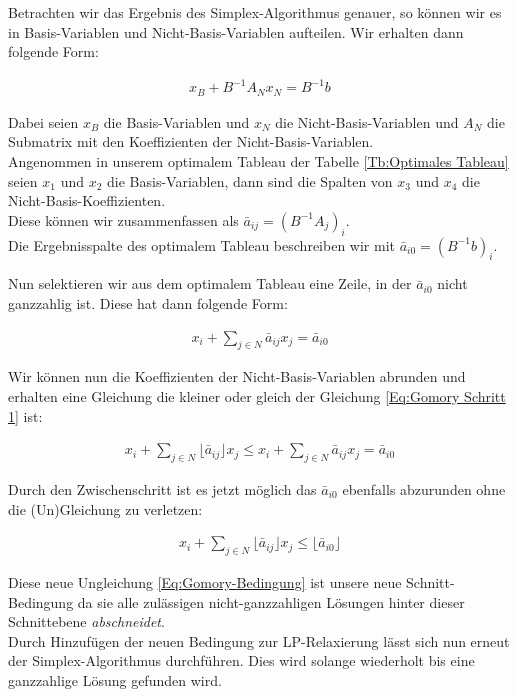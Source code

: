 \documentclass[tog]{acmsiggraph}
\begin{document}
Betrachten wir das Ergebnis des Simplex-Algorithmus genauer, so können wir es in Basis-Variablen und Nicht-Basis-Variablen aufteilen. Wir erhalten dann folgende Form:

\large
\begin{align}
\label{Eq:SimplexBasis}
x_B + B^{-1} A_N x_N = B^{-1}b
\end{align}
\normalsize

Dabei seien $x_B$ die Basis-Variablen und $x_N$ die Nicht-Basis-Variablen und $A_N$ die Submatrix mit den Koeffizienten der Nicht-Basis-Variablen.\\
Angenommen in unserem optimalem Tableau der Tabelle \ref{Tb:Optimales Tableau} seien $x_1$ und $x_2$ die Basis-Variablen, dann sind die Spalten von $x_3$ und $x_4$ die Nicht-Basis-Koeffizienten.\\
Diese können wir zusammenfassen als $\bar{a}_{ij} = (B^{-1} A_j)_i$. \\
Die Ergebnisspalte des optimalem Tableau beschreiben wir mit $\bar{a}_{i0} = (B^{-1} b)_i$.

Nun selektieren wir aus dem optimalem Tableau eine Zeile, in der $\bar{a}_{i0}$ nicht ganzzahlig ist. Diese hat dann folgende Form:

\large
\begin{align}
\label{Eq:Gomory Schritt 1}
x_i + \sum_{j \in N} \bar{a}_{ij} x_{j} = \bar{a}_{i0}
\end{align}
\normalsize

Wir können nun die Koeffizienten der Nicht-Basis-Variablen abrunden und erhalten eine Gleichung die kleiner oder gleich der Gleichung \ref{Eq:Gomory Schritt 1} ist:

\large
\begin{align}
\label{Eq:Gomory Schritt 2}
 x_i + \sum_{j \in N} \lfloor\bar{a}_{ij}\rfloor x_{j} \leq x_i + \sum_{j \in N} \bar{a}_{ij} x_{j} = \bar{a}_{i0}
\end{align}
\normalsize

Durch den Zwischenschritt ist es jetzt möglich das $\bar{a}_{i0}$ ebenfalls abzurunden ohne die (Un)Gleichung zu verletzen:

\large
\begin{align}
\label{Eq:Gomory-Bedingung}
 x_i + \sum_{j \in N} \lfloor\bar{a}_{ij}\rfloor x_{j} \leq \lfloor \bar{a}_{i0} \rfloor
\end{align}
\normalsize

Diese neue Ungleichung \ref{Eq:Gomory-Bedingung} ist unsere neue Schnitt-Bedingung da sie alle zulässigen nicht-ganzzahligen Lösungen hinter dieser Schnittebene \textit{abschneidet}.\\
Durch Hinzufügen der neuen Bedingung zur LP-Relaxierung lässt sich nun erneut der Simplex-Algorithmus durchführen. Dies wird solange wiederholt bis eine ganzzahlige Lösung gefunden wird.
\end{document}
